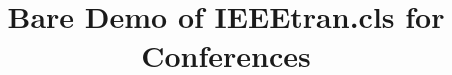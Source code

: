 \documentclass[conference]{IEEEtran}
\begin{document}
\title{Bare Demo of IEEEtran.cls for Conferences}


\maketitle
\thispagestyle{plain}
\pagestyle{plain}












\end{document}
